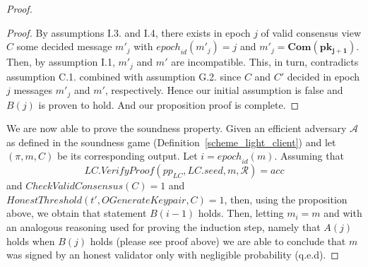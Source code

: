 \begin{proof}
\begin{proof}

\noindent By assumptions I.3. and I.4, there exists in epoch $j$ of valid consensus view $C$ some decided message $m'_j$ with 
$\mathit{epoch}_{\mathit{id}}(m'_j) = j$ and $m'_j =\mathbf{Com}(\mathbf{pk_{j+1}})$.
Then, by assumption I.1, $m'_j$ and $m'$ are incompatible. This, in turn, contradicts assumption C.1. combined with assumption G.2. 
since $C$ and $C'$ decided in epoch $j$ messages $m'_j$ and $m'$, respectively.
Hence our initial assumption is false and $B(j)$ is proven to hold. And our proposition proof is complete.
\end{proof}

\noindent 
We are now able to prove the soundness property. Given an efficient adversary $\mathcal{A}$ 
as defined in the soundness game (Definition~\ref{scheme_light_client}) and let $(\pi, m, C)$ 
be its corresponding output. Let $i = \mathit{epoch}_{\mathit{id}}(m)$. Assuming that 
$$\mathit{LC.VerifyProof}(\mathit{pp}_{\mathit{LC}}, \mathit{LC.seed}, m, \mathcal{R}) = \mathit{acc}$$ and 
$\mathit{CheckValidConsensus}(C) = 1$ and $\mathit{HonestThreshold}(t', \mathit{OGenerateKeypair}, C) = 1$, 
then, using the proposition above, we obtain that statement $B(i-1)$ holds. Then, letting $m_i = m$ and with an analogous 
reasoning used for proving the induction step, namely that $A(j)$ holds when $B(j)$ holds (please see proof above) we are able to conclude 
that $m$ was signed by an honest validator only with negligible probability (q.e.d).
\end{proof}
